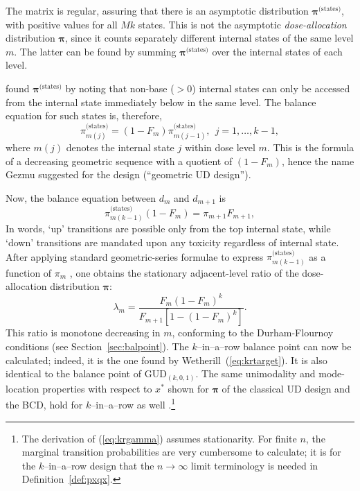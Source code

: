 The matrix is regular, assuring that there is an asymptotic distribution $\boldsymbol{\pi}^{\textrm{(states)}}$, with positive values for all $Mk$ states. This is not the asymptotic \emph{dose-allocation} distribution $\boldsymbol{\pi}$, since it counts separately different internal states of the same level $m$. The latter can be found by summing $\boldsymbol{\pi}^{\textrm{(states)}}$ over the internal states of each level.

\cite{Gezm:Geom:1996} found  $\boldsymbol{\pi}^{\textrm{(states)}}$ by noting that non-base ($>0$) internal states can only be accessed from the internal state immediately below in the same level. The balance equation for such states is, therefore,
%
\begin{equation}\label{eq:kinternal}
\pi^{\textrm{(states)}}_{m(j)}=\left(1-F_m\right)\pi^{\textrm{(states)}}_{m(j-1)},\ \ j=1,\ldots,k-1,
\end{equation}
\noindent where $m(j)$ denotes the internal state $j$ within dose level $m$. This is the formula of a decreasing geometric sequence with a quotient of $\left(1-F_m\right)$, hence the name Gezmu suggested for the design (``geometric UD design'').

Now, the balance equation between $d_m$ and $d_{m+1}$ is
%
\begin{equation}\label{eq:kexternal}
\pi^{\textrm{(states)}}_{m(k-1)}\left(1-F_m\right)=\pi_{m+1}F_{m+1},
\end{equation}
%
\noindent In words, `up' transitions are possible only from the top internal state, while `down' transitions are mandated upon any toxicity regardless of internal state. After applying standard geometric-series formulae to express $\pi^{\textrm{(states)}}_{m(k-1)}$ as a function of $\pi_m$ , one obtains the stationary adjacent-level ratio of the dose-allocation distribution $\boldsymbol{\pi}$:
%
\begin{equation}\label{eq:krgamma}
\lambda_m=\frac{F_m\left(1-F_m\right)^{k}}{F_{m+1}\left[1-\left(1-F_m\right)^{k}\right]}.
\end{equation}
%
This ratio is monotone decreasing in $m$, conforming to the Durham-Flournoy conditions
(see Section~\ref{sec:balpoint}). The $k$--in--a--row balance point can now be calculated; indeed, it is the one found by Wetherill~(\ref{eq:krtarget}). It is also identical to the balance point of GUD$_{(k,0,1)}$. The same unimodality and mode-location properties with respect to $x^*$ shown for $\boldsymbol{\pi}$ of the classical UD design and the BCD, hold for $k$--in--a--row as well \citep{Oron:Hoff:thek:2009}.\footnote{The derivation of (\ref{eq:krgamma}) assumes stationarity. For finite $n$, the marginal transition probabilities are very cumbersome to calculate; it is for the $k$--in--a--row design that the $n\to\infty$ limit terminology is needed in Definition~\ref{def:pxqx}.}
